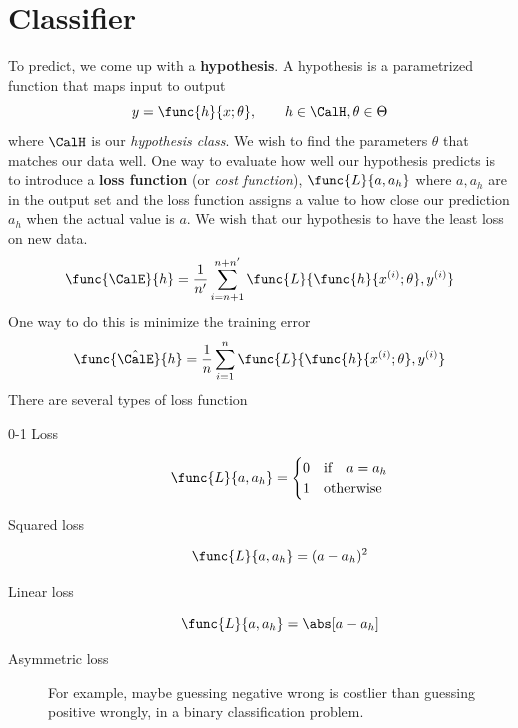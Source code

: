 \chapter{Classifier}
To predict, we come up with a \textbf{hypothesis}. A hypothesis is a parametrized function that maps input to output
\begin{equation*}
    y = \func{h}{x ; \theta} , \qquad h \in \CalH, \theta \in \Theta
\end{equation*}
where \(\CalH\) is our \textit{hypothesis class}. We wish to find the parameters \(\theta\) that matches our data well. One way to evaluate how well our hypothesis predicts is to introduce a \textbf{loss function} (or \textit{cost function}), \(\func{L}{a,a_h}\) where \(a,a_h\) are in the output set and the loss function assigns a value to how close our prediction \(a_h\) when the actual value is \(a\). We wish that our hypothesis to have the least loss on new data.
\begin{equation*}
    \func{\CalE}{h} = \dfrac{1}{n'} \sum_{i = n + 1}^{n + n'} \func{L}{\func{h}{x^{(i)} ; \theta }, y^{(i)}}
\end{equation*}
One way to do this is minimize the training error 
\begin{equation*}
    \func{\hat{\CalE}}{h} = \dfrac{1}{n} \sum_{i = 1}^n \func{L}{\func{h}{x^{(i)} ; \theta }, y^{(i)}}
\end{equation*}
There are several types of loss function
\begin{description}
    \item[0-1 Loss]
        \begin{equation*}
            \func{L}{a,a_h} = \begin{cases}
                0 & \text{if} \quad a = a_h \\
                1 & \text{otherwise}
            \end{cases}
        \end{equation*}
    \item[Squared loss]
        \begin{equation*}
            \func{L}{a,a_h} = (a - a_h)^2
        \end{equation*}
    \item[Linear loss]
        \begin{equation*}
            \func{L}{a,a_h} = \abs[a - a_h]
        \end{equation*}
    \item[Asymmetric loss] For example, maybe guessing negative wrong is costlier than guessing positive wrongly, in a binary classification problem.
\end{description}
